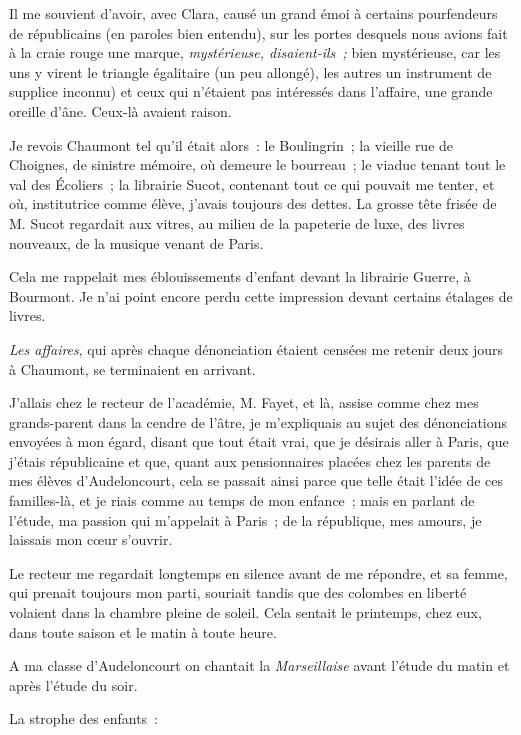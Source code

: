 \documentclass[french,twoside]{book} %
\begin{document}
Il me souvient d’avoir, avec Clara, causé un grand émoi à certains pourfendeurs de républicains (en paroles bien entendu), sur les portes desquels nous avions fait à la craie rouge une marque, \emph{mystérieuse, disaient-ils ;} bien mystérieuse,  car les uns y virent le triangle égalitaire (un peu allongé), les autres un instrument de supplice inconnu) et ceux qui n’étaient pas intéressés dans l’affaire, une grande oreille d’âne. Ceux-là avaient raison.\par
Je revois Chaumont tel qu’il était alors : le Boulingrin ; la vieille rue de Choignes, de sinistre mémoire, où demeure le bourreau ; le viaduc tenant tout le val des Écoliers ; la librairie Sucot, contenant tout ce qui pouvait me tenter, et où, institutrice comme élève, j’avais toujours des dettes. La grosse tête frisée de M. Sucot regardait aux vitres, au milieu de la papeterie de luxe, des livres nouveaux, de la musique venant de Paris.\par
Cela me rappelait mes éblouissements d’enfant devant la librairie Guerre, à Bourmont. Je n’ai point encore perdu cette impression devant certains étalages de livres.\par
\emph{Les affaires}, qui après chaque dénonciation étaient censées me retenir deux jours à Chaumont, se terminaient en arrivant.\par
J’allais chez le recteur de l’académie, M. Fayet, et là, assise comme chez mes grands-parent dans la cendre de l’âtre, je m’expliquais au sujet des dénonciations envoyées à mon égard, disant que tout était vrai, que je désirais aller à Paris,  que j’étais républicaine et que, quant aux pensionnaires placées chez les parents de mes élèves d’Audeloncourt, cela se passait ainsi parce que telle était l’idée de ces familles-là, et je riais comme au temps de mon enfance ; mais en parlant de l’étude, ma passion qui m’appelait à Paris ; de la république, mes amours, je laissais mon cœur s’ouvrir.\par
Le recteur me regardait longtemps en silence avant de me répondre, et sa femme, qui prenait toujours mon parti, souriait tandis que des colombes en liberté volaient dans la chambre pleine de soleil. Cela sentait le printemps, chez eux, dans toute saison et le matin à toute heure.\par
A ma classe d’Audeloncourt on chantait la \emph{Marseillaise} avant l’étude du matin et après l’étude du soir.\par
La strophe des enfants :\par
\end{document}
